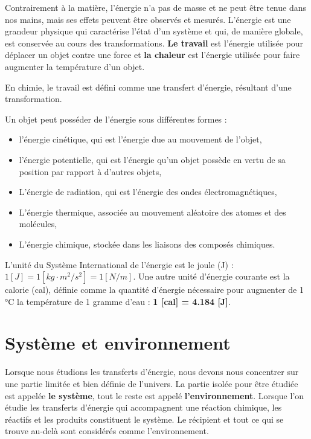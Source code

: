 \documentclass[
  11pt,
  french,
  a4paper,
  openany]{book}
\providecommand{\tightlist}{%
  \setlength{\itemsep}{0pt}\setlength{\parskip}{0pt}}
\begin{document}
Contrairement à la matière, l'énergie n'a pas de masse et ne peut être tenue dans nos mains, mais ses effets peuvent être observés et mesurés. L'énergie est une grandeur physique qui caractérise l'état d'un système et qui, de manière globale, est conservée au cours des transformations. \textbf{Le travail} est l'énergie utilisée pour déplacer un objet contre une force et \textbf{la chaleur} est l'énergie utilisée pour faire augmenter la température d'un objet.

En chimie, le travail est défini comme une transfert d'énergie, résultant d'une transformation.

\clearpage

Un objet peut posséder de l'énergie sous différentes formes :

\begin{itemize}
\tightlist
\item
  l'énergie cinétique, qui est l'énergie due au mouvement de l'objet,
\item
  l'énergie potentielle, qui est l'énergie qu'un objet possède en vertu de sa position par rapport à d'autres objets,
\item
  L'énergie de radiation, qui est l'énergie des ondes électromagnétiques,
\item
  L'énergie thermique, associée au mouvement aléatoire des atomes et des molécules,
\item
  L'énergie chimique, stockée dans les liaisons des composés chimiques.
\end{itemize}

L'unité du Système International de l'énergie est le joule (J) : \(1 [J] = 1 [kg \cdot m^2 / s^2] = 1 [N/m]\). Une autre unité d'énergie courante est la calorie (cal), définie comme la quantité d'énergie nécessaire pour augmenter de 1 °C la température de 1 gramme d'eau : \textbf{1 {[}cal{]} = 4.184 {[}J{]}}.

\hypertarget{systuxe8me-et-environnement}{%
\section{Système et environnement}\label{systuxe8me-et-environnement}}

Lorsque nous étudions les transferts d'énergie, nous devons nous concentrer sur une partie limitée et bien définie de l'univers. La partie isolée pour être étudiée est appelée \textbf{le système}, tout le reste est appelé \textbf{l'environnement}. Lorsque l'on étudie les transferts d'énergie qui accompagnent une réaction chimique, les réactifs et les produits constituent le système. Le récipient et tout ce qui se trouve au-delà sont considérés comme l'environnement.
\end{document}
